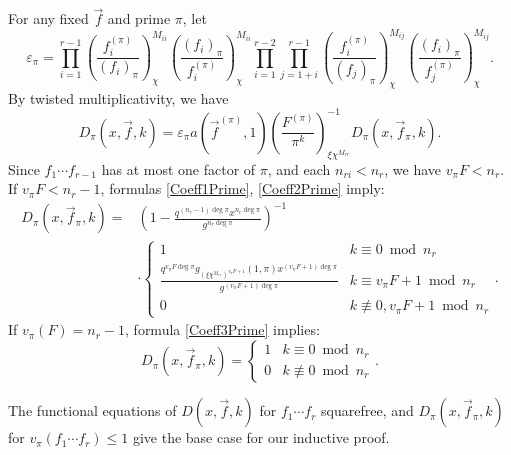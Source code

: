 \documentclass[11pt,letterpaper]{article}
\theoremstyle{definition}
\theoremstyle{remark}
\numberwithin{equation}{section}
\theoremstyle{dotless}
\newcommand{\res}[2]{\left(\frac{#1}{#2}\right)}
\begin{document}
For any fixed $\vec{f}$ and prime $\pi$, let
\begin{equation}\label{LocalRoot}
\varepsilon_\pi=\prod_{i=1}^{r-1} \res{f_i^{(\pi)}}{(f_i)_\pi}_{\chi}^{M_{ii}} \res{(f_i)_\pi}{f_i^{(\pi)}}_{\chi}^{M_{ii}} \prod_{i=1}^{r-2}\prod_{j=1+i}^{r-1}\res{f_i^{(\pi)}}{(f_j)_\pi}_{\chi}^{M_{ij}} \res{(f_i)_\pi}{f_j^{(\pi)}}_{\chi}^{M_{ij}}.
\end{equation}
By twisted multiplicativity, we have
\begin{equation}\label{LocalSimplification}
D_{\pi}(x, \vec{f}, k) = \varepsilon_\pi a(\vec{f}^{(\pi)}, 1) \res{F^{(\pi)}}{\pi^k}_{\xi \chi^{M_{rr}}}^{-1} D_{\pi}(x, \vec{f}_\pi, k).
\end{equation}
Since $f_1 \cdots f_{r-1}$ has at most one factor of $\pi$, and each $n_{ri}<n_r$, we have $v_{\pi} F<n_r$. If $v_{\pi} F<n_r-1$, formulas \eqref{Coeff1Prime}, \eqref{Coeff2Prime} imply:
\begin{equation} \label{LocalKubotaD1}
\begin{split}
D_\pi(x, \vec{f}_\pi, k)=&\left(1 -\frac{q^{(n_r-1)\deg \pi}x^{n_r \deg \pi}}{g^{n_r \deg \pi}}\right)^{-1} \\
&\cdot \left\lbrace \begin{array}{cc} 1 & k \equiv 0 \bmod n_r \\ \frac{q^{v_{\pi} F \deg \pi} g_{(\xi \chi^{M_{rr}})^{v_{\pi} F+1}}(1, \pi)x^{(v_{\pi} F+1)\deg \pi}}{g^{(v_{\pi} F+1)\deg \pi}} & k \equiv v_{\pi} F+1 \bmod n_r \\ 0 & k \not\equiv 0, v_{\pi} F+1 \bmod n_r \end{array}\right. .
\end{split}
\end{equation}
If $v_{\pi}(F)=n_r-1$, formula \eqref{Coeff3Prime} implies:
\begin{equation}\label{LocalKubotaD2}
D_\pi(x, \vec{f}_\pi, k) = \left\lbrace \begin{array}{cc} 1 & k \equiv 0 \bmod n_r \\ 0 & k \not\equiv 0 \bmod n_r \end{array}\right. .
\end{equation}

The functional equations of $D(x, \vec{f}, k)$ for $f_1\cdots f_r$ squarefree, and $D_\pi(x, \vec{f}_\pi, k)$ for $v_{\pi} (f_1\cdots f_r) \leq 1$ give the base case for our inductive proof. 
\end{document}
